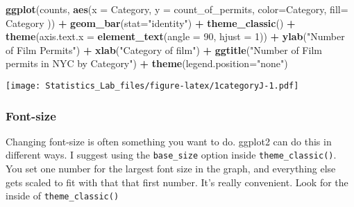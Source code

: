\documentclass[
]{book}
\newenvironment{Shaded}{\begin{snugshade}}{\end{snugshade}}
\newcommand{\AttributeTok}[1]{\textcolor[rgb]{0.13,0.29,0.53}{#1}}
\newcommand{\DecValTok}[1]{\textcolor[rgb]{0.00,0.00,0.81}{#1}}
\newcommand{\FunctionTok}[1]{\textcolor[rgb]{0.13,0.29,0.53}{\textbf{#1}}}
\newcommand{\NormalTok}[1]{#1}
\newcommand{\SpecialCharTok}[1]{\textcolor[rgb]{0.81,0.36,0.00}{\textbf{#1}}}
\newcommand{\StringTok}[1]{\textcolor[rgb]{0.31,0.60,0.02}{#1}}
\begin{document}
\begin{Shaded}
\begin{Highlighting}[]
\FunctionTok{ggplot}\NormalTok{(counts, }\FunctionTok{aes}\NormalTok{(}\AttributeTok{x =}\NormalTok{ Category, }\AttributeTok{y =}\NormalTok{ count\_of\_permits, }
                   \AttributeTok{color=}\NormalTok{Category, }
                   \AttributeTok{fill=}\NormalTok{ Category )) }\SpecialCharTok{+}
  \FunctionTok{geom\_bar}\NormalTok{(}\AttributeTok{stat=}\StringTok{"identity"}\NormalTok{) }\SpecialCharTok{+} 
  \FunctionTok{theme\_classic}\NormalTok{() }\SpecialCharTok{+}
  \FunctionTok{theme}\NormalTok{(}\AttributeTok{axis.text.x =} \FunctionTok{element\_text}\NormalTok{(}\AttributeTok{angle =} \DecValTok{90}\NormalTok{, }\AttributeTok{hjust =} \DecValTok{1}\NormalTok{)) }\SpecialCharTok{+}
  \FunctionTok{ylab}\NormalTok{(}\StringTok{"Number of Film Permits"}\NormalTok{) }\SpecialCharTok{+} 
  \FunctionTok{xlab}\NormalTok{(}\StringTok{"Category of film"}\NormalTok{) }\SpecialCharTok{+}
  \FunctionTok{ggtitle}\NormalTok{(}\StringTok{"Number of Film permits in NYC by Category"}\NormalTok{) }\SpecialCharTok{+}
  \FunctionTok{theme}\NormalTok{(}\AttributeTok{legend.position=}\StringTok{"none"}\NormalTok{) }
\end{Highlighting}
\end{Shaded}

\texttt{[image: Statistics\_Lab\_files/figure-latex/1categoryJ-1.pdf]}

\hypertarget{font-size}{%
\subsubsection{Font-size}\label{font-size}}

Changing font-size is often something you want to do. ggplot2 can do this in different ways. I suggest using the \texttt{base\_size} option inside \texttt{theme\_classic()}. You set one number for the largest font size in the graph, and everything else gets scaled to fit with that that first number. It's really convenient. Look for the inside of \texttt{theme\_classic()}
\end{document}
